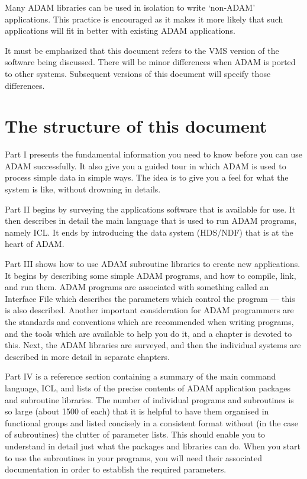 Many ADAM libraries can be used in isolation to write `non-ADAM' applications.
This practice is encouraged as it makes it more likely that such applications
will fit in better with existing ADAM applications.

It must be emphasized that this document refers to the VMS version of the
software being discussed.
There will be minor differences when ADAM is ported to other systems.
Subsequent versions of this document will specify those differences.

\section{The structure of this document}
\label{S_strucdoc}

Part I presents the fundamental information you need to know before you can
use ADAM successfully.
It also give you a guided tour in which ADAM is used to process simple data
in simple ways.
The idea is to give you a feel for what the system is like, without drowning
in details.

Part II begins by surveying the applications software that is available for use.
It then describes in detail the main language that is used to run ADAM programs,
namely ICL.
It ends by introducing the data system (HDS/NDF) that is at the heart of ADAM.

Part III shows how to use ADAM subroutine libraries to create new applications.
It begins by describing some simple ADAM programs, and how to compile, link,
and run them.
ADAM programs are associated with something called an Interface File which
describes the parameters which control the program --- this is also described.
Another important consideration for ADAM programmers are the standards and
conventions which are recommended when writing programs, and the tools which
are available to help you do it, and a chapter is devoted to this.
Next, the ADAM libraries are surveyed, and then the individual systems are
described in more detail in separate chapters.

Part IV is a reference section containing a summary of the main command
language, ICL, and lists of the precise contents of ADAM application packages
and subroutine libraries.
The number of individual programs and subroutines is so large (about 1500 of
each) that it is helpful to have them organised in functional groups and listed
concisely in a consistent format without (in the case of subroutines) the
clutter of parameter lists.
This should enable you to understand in detail just what the packages and
libraries can do.
When you start to use the subroutines in your programs, you will need their
associated documentation in order to establish the required parameters.

